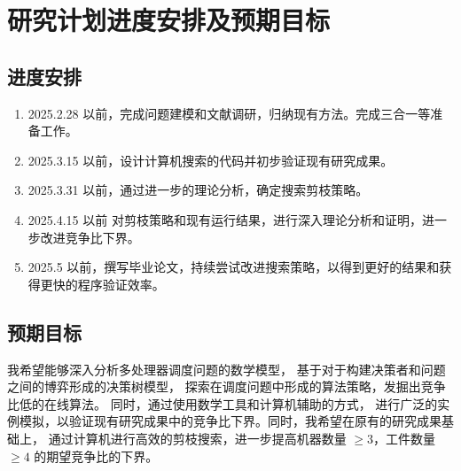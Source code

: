 \section{研究计划进度安排及预期目标}

\subsection{进度安排}

\begin{enumerate}
    \item 2025.2.28 以前，完成问题建模和文献调研，归纳现有方法。完成三合一等准备工作。
    \item 2025.3.15 以前，设计计算机搜索的代码并初步验证现有研究成果。
    \item 2025.3.31 以前，通过进一步的理论分析，确定搜索剪枝策略。
    \item 2025.4.15 以前 对剪枝策略和现有运行结果，进行深入理论分析和证明，进一步改进竞争比下界。
    \item 2025.5 以前，撰写毕业论文，持续尝试改进搜索策略，以得到更好的结果和获得更快的程序验证效率。
\end{enumerate}

\subsection{预期目标}

我希望能够深入分析多处理器调度问题的数学模型，
基于对于构建决策者和问题之间的博弈形成的决策树模型，
探索在调度问题中形成的算法策略，发掘出竞争比低的在线算法。
同时，通过使用数学工具和计算机辅助的方式，
进行广泛的实例模拟，以验证现有研究成果中的竞争比下界。同时，我希望在原有的研究成果基础上，
通过计算机进行高效的剪枝搜索，进一步提高机器数量 $\geq 3$，工件数量 $\geq 4$ 的期望竞争比的下界。
